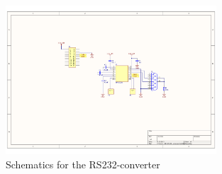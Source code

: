 \begin{figure}
	\begin{center}
		\includegraphics[width=0.7\textwidth, trim=360 220 190 180, clip=true]{../Schematics/RPI-RS232-schematic.pdf}
	\end{center}
	\caption{Schematics for the RS232-converter}
	\label{fig:UART-RS232}
\end{figure}

